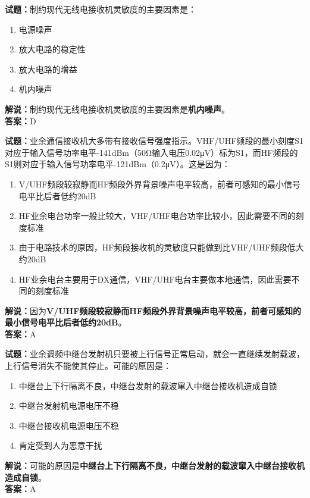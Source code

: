 \documentclass{ctexbook}
\begin{document}
\bigskip


\noindent\textbf{试题：}制约现代无线电接收机灵敏度的主要因素是：
\begin{enumerate}[leftmargin=3em]
\item 电源噪声
\item 放大电路的稳定性
\item 放大电路的增益
\item 机内噪声
\end{enumerate}
\noindent\textbf{解说：}制约现代无线电接收机灵敏度的主要因素是\textbf{机内噪声}。\\\noindent\textbf{答案：}D


\bigskip


\noindent\textbf{试题：}业余通信接收机大多带有接收信号强度指示。VHF/UHF频段的最小刻度S1对应于输入信号功率电平-141dBm（50Ω输入电压0.02μV）标为S1，而HF频段的S1则对应于输入信号功率电平-121dBm（0.2μV）。这是因为：
\begin{enumerate}[leftmargin=3em]
\item V/UHF频段较寂静而HF频段外界背景噪声电平较高，前者可感知的最小信号电平比后者低约20dB
\item HF业余电台功率一般比较大，VHF/UHF电台功率比较小，因此需要不同的刻度标准
\item 由于电路技术的原因，HF频段接收机的灵敏度只能做到比VHF/UHF频段低大约20dB
\item HF业余电台主要用于DX通信，VHF/UHF电台主要做本地通信，因此需要不同的刻度标准
\end{enumerate}
\noindent\textbf{解说：}因为\textbf{V/UHF频段较寂静而HF频段外界背景噪声电平较高，前者可感知的最小信号电平比后者低约20dB}。\\\noindent\textbf{答案：}A




\bigskip


\noindent\textbf{试题：}业余调频中继台发射机只要被上行信号正常启动，就会一直继续发射载波，上行信号消失不能使其停止。可能的原因是：
\begin{enumerate}[leftmargin=3em]
\item 中继台上下行隔离不良，中继台发射的载波窜入中继台接收机造成自锁
\item 中继台发射机电源电压不稳
\item 中继台接收机电源电压不稳
\item 肯定受到人为恶意干扰
\end{enumerate}
\noindent\textbf{解说：}可能的原因是\textbf{中继台上下行隔离不良，中继台发射的载波窜入中继台接收机造成自锁}。\\\noindent\textbf{答案：}A
\end{document}
